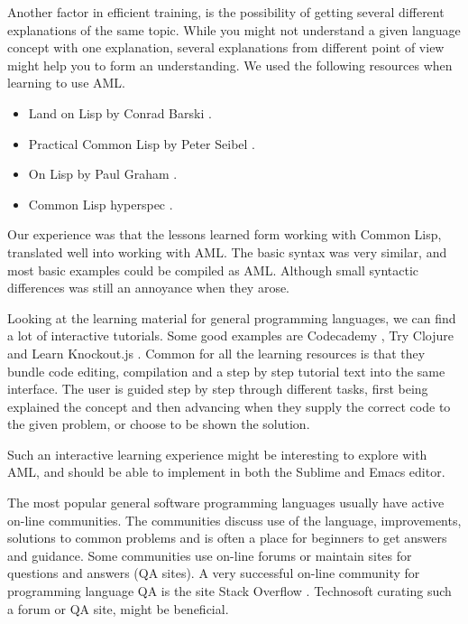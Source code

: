 Another factor in efficient training, is the possibility of getting several different explanations of the same topic. While you might not understand a given language concept with one explanation, several explanations from different point of view might help you to form an understanding. We used the following resources when learning to use AML.

\begin{itemize}
    \item Land on Lisp by Conrad Barski \cite{landoflisp}.

    \item Practical Common Lisp by Peter Seibel \cite{practicalcommonlisp}.

    \item On Lisp by Paul Graham \cite{Graham.1994}.

    \item Common Lisp hyperspec \cite{www.lispworks.com}.
\end{itemize}

Our experience was that the lessons learned form working with Common Lisp, translated well into working with AML. The basic syntax was very similar, and most basic examples could be compiled as AML. Although small syntactic differences was still an annoyance when they arose.

Looking at the learning material for general programming languages, we can find a lot of interactive tutorials. Some good examples are Codecademy \cite{codecademy}, Try Clojure \cite{tryclojure} and Learn Knockout.js \cite{learnknockoutjs}. Common for all the learning resources is that they bundle code editing, compilation and a step by step tutorial text into the same interface. The user is guided step by step through different tasks, first being explained the concept and then advancing when they supply the correct code to the given problem, or choose to be shown the solution.

Such an interactive learning experience might be interesting to explore with AML, and should be able to implement in both the Sublime and Emacs editor.

The most popular general software programming languages usually have active on-line communities. The communities discuss use of the language, improvements, solutions to common problems and is often a place for beginners to get answers and guidance. Some communities use on-line forums or maintain sites for questions and answers (QA sites). A very successful on-line community for programming language QA is the site Stack Overflow \cite{stackoverflow}. Technosoft curating such a forum or QA site, might be beneficial.
